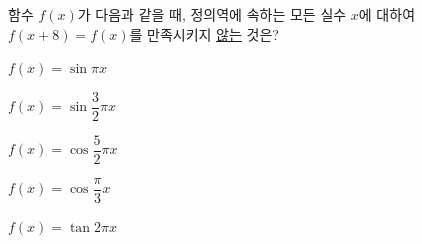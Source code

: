 함수 $f(x)$가 다음과 같을 때, 정의역에 속하는 모든 실수 $x$에 대하여 $f(x+8)=f(x)$를 만족시키지 \underline{않는} 것은?
\begin{choicesii}{\rule[-3ex]{0pt}{8ex}$f(x)=\sin\pi x$}{\rule[-3ex]{0pt}{8ex}$f(x)=\sin\dfrac{3}{2}\pi x$}{\rule[-3ex]{0pt}{8ex}$f(x)=\cos\dfrac{5}{2}\pi x$}{\rule[-3ex]{0pt}{8ex}$f(x)=\cos\dfrac{\pi}{3}x$}{\rule[-3ex]{0pt}{8ex}$f(x)=\tan 2\pi x$}\end{choicesii}
